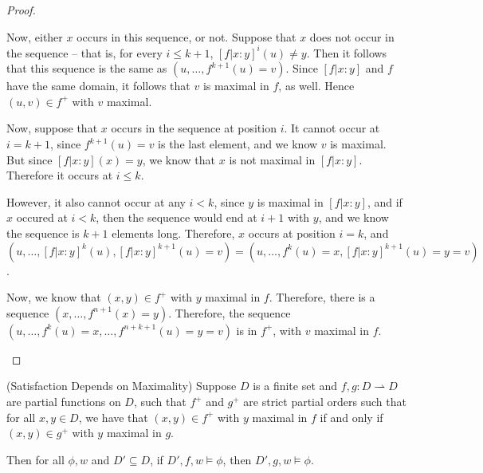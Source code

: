 \begin{proof}
\begin{enumerate}
\begin{itemize}
  Now, either $x$ occurs in this sequence, or not. Suppose that 
  $x$ does not occur in the sequence -- that is, for every $i \leq k+1$,
  $[f|x:y]^i(u) \not= y$. Then it follows that this sequence is 
  the same as $(u, \ldots, f^{k+1}(u) = v)$. Since $[f|x:y]$ and $f$
  have the same domain, it follows that $v$ is maximal in $f$, 
  as well. Hence $(u, v) \in f^+$ with $v$ maximal. 

  Now, suppose that $x$ occurs in the sequence at position $i$. It
  cannot occur at $i = k+1$, since $f^{k+1}(u) = v$ is the last
  element, and we know $v$ is maximal. But since $[f|x:y](x) = y$, we
  know that $x$ is not maximal in $[f|x:y]$. Therefore it occurs at $i
  \leq k$.

  However, it also cannot occur at any $i < k$, since $y$ is maximal
  in $[f|x:y]$, and if $x$ occured at $i < k$, then the sequence would
  end at $i+1$ with $y$, and we know the sequence is $k+1$ elements
  long. Therefore, $x$ occurs at position $i = k$, and $(u, \ldots,
  [f|x:y]^k(u), [f|x:y]^{k+1}(u) = v) = (u, \ldots, f^k(u) = x, [f|x:y]^{k+1}(u) = y = v)$.

  Now, we know that $(x,y) \in f^+$ with $y$ maximal in $f$. Therefore,
  there is a sequence $(x, \ldots, f^{n+1}(x) = y)$. Therefore, 
  the sequence $(u, \ldots, f^k(u) = x, \ldots, f^{n+k+1}(u) = y = v)$ is 
  in $f^+$, with $v$ maximal in $f$. 

\end{itemize}
\end{enumerate}
\end{proof}

\begin{lemma}{(Satisfaction Depends on Maximality)}
Suppose $D$ is a finite set and $f,g : D \rightharpoonup D$ are
partial functions on $D$, such that $f^+$ and $g^+$ are strict partial
orders such that for all $x,y \in D$, we have that $(x,y) \in f^+$
with $y$ maximal in $f$ if and only if $(x,y) \in g^+$ with $y$
maximal in $g$.

Then for all $\phi, w$ and $D' \subseteq D$, if $D', f, w \models \phi$,
then $D', g, w \models \phi$. 
\end{lemma}

% 


